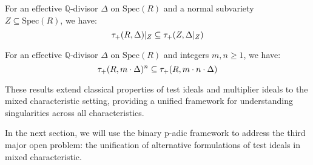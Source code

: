 \begin{corollary}\label{cor:restriction-formula}
For an effective $\mathbb{Q}$-divisor $\Delta$ on $\text{Spec}(R)$ and a normal subvariety $Z \subseteq \text{Spec}(R)$, we have:
$$\tau_+(R,\Delta)|_Z \subseteq \tau_+(Z,\Delta|_Z)$$
\end{corollary}

\begin{corollary}\label{cor:powers-test-ideals}
For an effective $\mathbb{Q}$-divisor $\Delta$ on $\text{Spec}(R)$ and integers $m, n \geq 1$, we have:
$$\tau_+(R,m \cdot \Delta)^n \subseteq \tau_+(R, m \cdot n \cdot \Delta)$$
\end{corollary}

These results extend classical properties of test ideals and multiplier ideals to the mixed characteristic setting, providing a unified framework for understanding singularities across all characteristics.

In the next section, we will use the binary p-adic framework to address the third major open problem: the unification of alternative formulations of test ideals in mixed characteristic. 